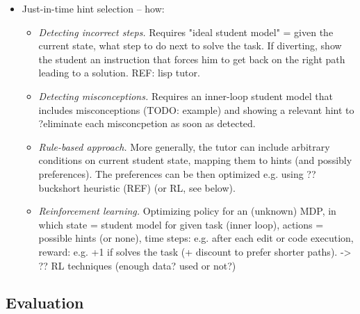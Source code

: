\begin{itemize}
\item Just-in-time hint selection -- how:
\begin{itemize}
\item \emph{Detecting incorrect steps.}
  Requires "ideal student model" = given the current state, what step to do
  next to solve the task.
  If diverting, show the student an instruction that forces him to get back on
  the right path leading to a solution.
  REF: lisp tutor.
\item \emph{Detecting misconceptions.}
  Requires an inner-loop student model that includes misconceptions (TODO: example)
  and showing a relevant hint to ?eliminate each misconcpetion as soon as detected.
\item \emph{Rule-based approach.}
  More generally, the tutor can include arbitrary conditions on current student state,
  mapping them to hints (and possibly preferences).
  The preferences can be then optimized e.g. using ?? buckshort heuristic (REF) (or RL, see below).
\item \emph{Reinforcement learning.}
  Optimizing policy for an (unknown) MDP, in which
  state = student model for given task (inner loop),
  actions = possible hints (or none),
  time steps: e.g. after each edit or code execution,
  reward: e.g. +1 if solves the task (+ discount to prefer shorter paths).
  -> ?? RL techniques (enough data? used or not?)
\end{itemize}
\end{itemize}


\subsection{Evaluation}
\label{tutors.evaluation}

